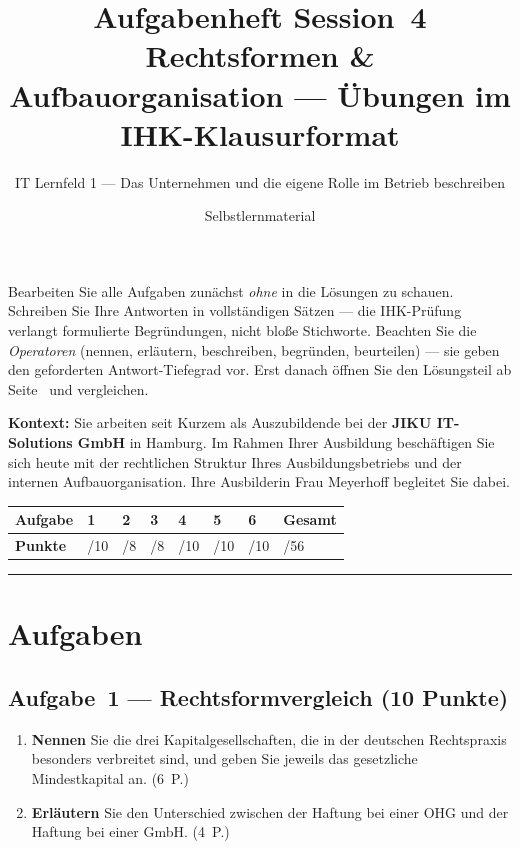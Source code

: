\documentclass[11pt, a4paper]{article}
\title{\vspace*{-1.5cm}\Huge\bfseries\color{bfwPrimaryDark}Aufgabenheft Session~4\\[0.4em]
  \large\color{bfwInkSoft}\textnormal{Rechtsformen \& Aufbauorganisation --- Übungen im IHK-Klausurformat}}
\author{\textsf{IT Lernfeld 1 --- Das Unternehmen und die eigene Rolle im Betrieb beschreiben}}
\date{Selbstlernmaterial}
\begin{document}
\maketitle
\thispagestyle{empty}

\begin{merksatz}[title={\bfseries So nutzen Sie dieses Aufgabenheft}]
Bearbeiten Sie alle Aufgaben zunächst \emph{ohne} in die Lösungen zu schauen. Schreiben
Sie Ihre Antworten in vollständigen Sätzen --- die IHK-Prüfung verlangt formulierte
Begründungen, nicht bloße Stichworte. Beachten Sie die \emph{Operatoren} (nennen,
erläutern, beschreiben, begründen, beurteilen) --- sie geben den geforderten
Antwort-Tiefegrad vor. Erst danach öffnen Sie den Lösungsteil ab Seite~\pageref{loesungen}
und vergleichen.
\end{merksatz}

\bigskip

\textbf{Kontext:} Sie arbeiten seit Kurzem als Auszubildende bei der \textbf{JIKU IT-Solutions GmbH}
in Hamburg. Im Rahmen Ihrer Ausbildung beschäftigen Sie sich heute mit der rechtlichen Struktur
Ihres Ausbildungsbetriebs und der internen Aufbauorganisation. Ihre Ausbilderin Frau Meyerhoff
begleitet Sie dabei.

\bigskip

\noindent
\begin{tabular}{|l|l|l|l|l|l|l|l|}
\hline
\textbf{Aufgabe} & 1 & 2 & 3 & 4 & 5 & 6 & \textbf{Gesamt}\\
\hline
\textbf{Punkte} & /10 & /8 & /8 & /10 & /10 & /10 & /56\\
\hline
\end{tabular}

\tableofcontents
\vspace{1em}
\hrule

\section{Aufgaben}

\subsection*{Aufgabe~1 --- Rechtsformvergleich (10 Punkte)}

\begin{enumerate}[label=(\alph*)]
  \item \textbf{Nennen} Sie die drei Kapitalgesellschaften, die in der deutschen Rechtspraxis besonders
  verbreitet sind, und geben Sie jeweils das gesetzliche Mindestkapital an. \hfill (6~P.)

  \vspace{5cm}

  \item \textbf{Erläutern} Sie den Unterschied zwischen der Haftung bei einer OHG und der Haftung
  bei einer GmbH. \hfill (4~P.)

  \vspace{4.5cm}
\end{enumerate}
\end{document}
